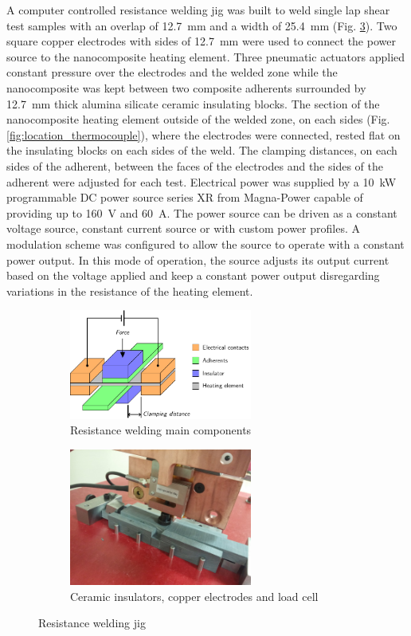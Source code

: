 \documentclass[11pt,review,times]{elsarticle}
\begin{document}
A computer controlled resistance welding jig was built to weld single lap shear test samples with an overlap of \SI{12.7}{\milli\metre} and a width of \SI{25.4}{\milli\metre} (Fig. \ref{fig:welding_jig}). 
Two square copper electrodes with sides of \SI{12.7}{\milli\metre} were used to connect the power source to the nanocomposite heating element. 
Three pneumatic actuators applied constant pressure over the electrodes and the welded zone while the nanocomposite was kept between two composite adherents surrounded by \SI{12.7}{\milli\metre} thick alumina silicate ceramic insulating blocks. 
The section of the nanocomposite heating element outside of the welded zone, on each sides (Fig. \ref{fig:location_thermocouple}), where the electrodes were connected, rested flat on the insulating blocks on each sides of the weld. 
The clamping distances, on each sides of the adherent, between the faces of the electrodes and the sides of the adherent were adjusted for each test. 
Electrical power was supplied by a \SI{10}{\kW} programmable DC power source series XR from Magna-Power capable of providing up to \SI{160}{\volt} and \SI{60}{\ampere}. 
The power source can be driven as a constant voltage source, constant current source or with custom power profiles. 
A modulation scheme was configured to allow the source to operate with a constant power output. 
In this mode of operation, the source adjusts its output current based on the voltage applied and keep a constant power output disregarding variations in the resistance of the heating element. 

\begin{figure}[htb]
	\centering
	\captionsetup{width=125mm}
	\begin{subfigure}{60mm}
		\centering
		\captionsetup{width=60mm}
		\includegraphics[width=60mm]{beamer_IC3_DBrassard-figure1.pdf}
		\caption{Resistance welding main components}
		\label{fig:welding_jig_schematic}
	\end{subfigure}
	\begin{subfigure}{60mm}
		\centering
		\captionsetup{width=60mm}
		\includegraphics[width=60mm]{20161026_152818_resize.jpg}
		\caption{Ceramic insulators, copper electrodes and load cell}
		\label{fig:welding_jig_electrodes}
	\end{subfigure}%
	\caption{Resistance welding jig}
	\label{fig:welding_jig}
\end{figure}
\end{document}
